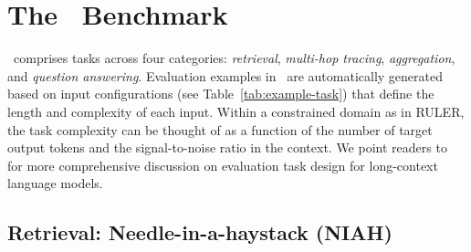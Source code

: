\section{The ~Benchmark}
~comprises tasks across four categories: \emph{retrieval}, \emph{multi-hop tracing}, \emph{aggregation}, and \emph{question answering}. Evaluation examples in ~are automatically generated based on input configurations (see Table~\ref{tab:example-task}) that define the length and complexity of each input. Within a constrained domain as in RULER, the task complexity can be thought of as a function of the number of target output tokens and the signal-to-noise ratio in the context. We point readers to ~\citep{goldman2024really} for more comprehensive discussion on evaluation task design for long-context language models.


\subsection{Retrieval: Needle-in-a-haystack (NIAH)} 

